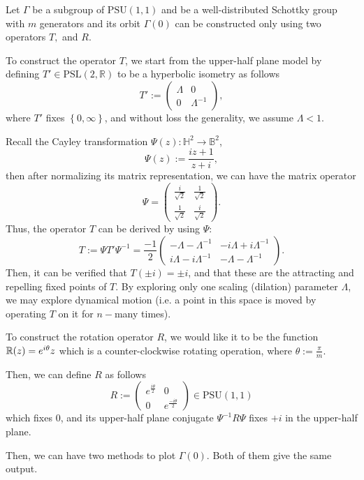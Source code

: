 \documentclass[12pt,oneside]{sfsuthesis}
\theoremstyle{plain} %
\theoremstyle{definition}  %
\theoremstyle{remark}  %
\theoremstyle{plain}
\begin{document}
{Let $\Gamma$ be a subgroup of $\text{PSU}(1,1)$ and be a well-distributed Schottky group with $m$ generators and its orbit $\Gamma(0)$ can be constructed only using two operators $T,$ and $R$.

To construct the operator $T$, we start from the upper-half plane model by defining $T'\in\text{PSL}(2,\mathbb{R})$ to be a hyperbolic isometry as follows
$$
T':=\begin{pmatrix}
\Lambda &  0 \\
0 &  \Lambda^{-1}
\end{pmatrix},
$$
where $T'$ fixes $\left\lbrace 0,\infty \right\rbrace$, and without loss the generality, we assume $\Lambda<1$.

Recall the Cayley transformation $\Psi(z):\mathbb{H}^2\to\mathbb{B}^2$,
$$
\Psi(z):=\frac{iz+1}{z+i}, 
$$
then after normalizing its matrix representation, we can have the matrix operator
$$
\Psi=\begin{pmatrix}
\frac{i}{\sqrt{2}} &  \frac{1}{\sqrt{2}} \\
\frac{1}{\sqrt{2}} &  \frac{i}{\sqrt{2}}
\end{pmatrix}.
$$
Thus, the operator $T$ can be derived by using $\Psi$:
$$
T:=\Psi T'\Psi^{-1}=\frac{-1}{2}\begin{pmatrix}
-\Lambda-\Lambda^{-1} &  -i\Lambda+i\Lambda^{-1}  \\
i\Lambda-i\Lambda^{-1} &  -\Lambda-\Lambda^{-1} 
\end{pmatrix}.
$$
Then, it can be verified that $T(\pm i)=\pm i$, and that these are the attracting and repelling fixed points of $T$. By exploring only one scaling (dilation) parameter $\Lambda$, we may explore dynamical motion (i.e. a point in this space is moved by operating $T$ on it for $n-$many times).


To construct the rotation operator $R$, we would like it to be the function $\mathbb{R}(z)=e^{i \theta }z$ which is a counter-clockwise rotating operation, where $\theta:=\frac{\pi}{m}$.

Then, we can define $R$ as follows
$$
R:=\begin{pmatrix}
e^{\frac{i\theta}{2}} &  0 \\
0 &  e^{\frac{-i\theta}{2}}
\end{pmatrix}\in\text{PSU}(1,1)
$$ 
which fixes $0$, and its upper-half plane conjugate $\Psi^{-1} R\Psi$ fixes $+i$ in the upper-half plane.

Then, we can have two methods to plot $\Gamma(0)$. Both of them give the same output.

}
\end{document}
